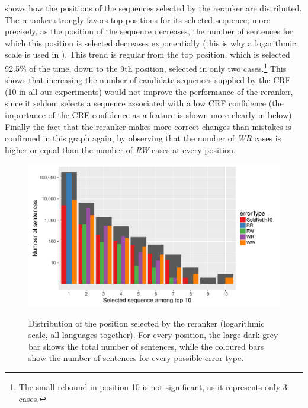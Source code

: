 \documentclass[output=paper
,modfonts
,nonflat]{langsci/langscibook}
\begin{document}
 shows how the positions of the
sequences selected by the reranker are distributed. The reranker
strongly favors top positions for its selected sequence; more
precisely, as the position of the sequence decreases, the number of
sentences for which this position is selected decreases exponentially
(this is why a logarithmic scale is used in
). This trend is regular from the top position,
which is selected 92.5\% of the time, down to the 9th position,
selected in only two cases.\footnote{The small rebound in position 10
  is not significant, as it represents only 3 cases.} This shows that
increasing the number of candidate sequences supplied by the CRF (10
in all our experiments) would not improve the performance of the
reranker, since it seldom selects a sequence associated with a low CRF
confidence (the importance of the CRF confidence as a feature is shown
more clearly in  below). Finally the fact
that the reranker makes more correct changes than mistakes is
confirmed in this graph again, by observing that the number of {\em
  WR} cases is higher or equal than the number of {\em RW} cases at
every position.


\begin{figure}
  \centering
      {\includegraphics[scale=0.4]{figures/graph-selected-seq-log-by-error-type.pdf}}
      {\caption{{Distribution of the position selected by the reranker
            (logarithmic scale, all languages together). } For every position, the large dark
          grey bar shows the total number of sentences, while the
          coloured bars show the number of sentences for every possible
          error type.\protect\footnotemark
        }\label{fig:selectedSeqNo}}
\end{figure}
\end{document}
